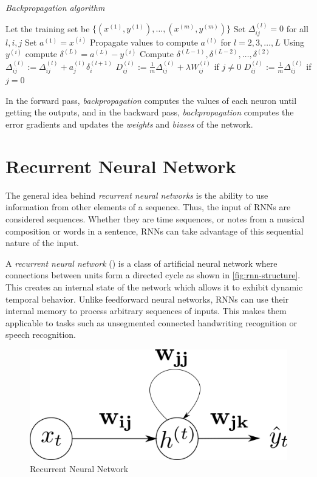 \begin{algorithm}[H]
  \caption{\textit{Backpropagation algorithm}}
  \label{backpropagation-algorithm}
  \begin{algorithmic}[1]
    \State Let the training set be $\{(x^{(1)},y^{(1)}),\dots,
    (x^{(m)},y^{(m)})\}$
    \State Set $\Delta_{ij}^{(l)} = 0$ for all $l,i,j$
    \State Set $a^{(1)} = x^{(i)}$
    \State Propagate values to compute $a^{(l)}$ for $l = 2,
    3, \dots, L$
    \State Using $y^{(i)}$ compute $\delta^{(L)} = a^{(L)} - y^{(i)}$
    \State Compute $\delta^{(L-1)}, \delta^{(L-2)}, \dots,
    \delta^{(2)}$
    \State $\Delta_{ij}^{(l)} := \Delta_{ij}^{(l)} + a_j^{(l)} \delta_i^{(l+1)}$
    \EndFor
    \State $D_{ij}^{(l)} := \frac{1}{m} \Delta_{ij}^{(l)} + \lambda
    W_{ij}^{(l)}$ if $j \neq 0$
    \State $D_{ij}^{(l)} := \frac{1}{m} \Delta_{ij}^{(l)}$ if $j = 0$
  \end{algorithmic}
\end{algorithm}

In the forward pass, \textit{backpropagation} computes the values of
each neuron until getting the outputs, and in the backward pass,
\textit{backpropagation} computes the error gradients and updates the
\textit{weights} and \textit{biases} of the network.

\section{Recurrent Neural Network}
\label{sec:rnn-nets}

The general idea behind \textit{recurrent neural networks} is the
ability to use information from other elements of a sequence. Thus,
the input of RNNs are considered sequences. Whether they are time
sequences, or notes from a musical composition or words in a sentence,
RNNs can take advantage of this sequential nature of the input.

A \textit{recurrent neural network} (\cite{rumelhart1986sequential})
is a class of artificial neural network where connections between
units form a directed cycle as shown in \autoref{fig:rnn-structure}.
This creates an internal state of the network which allows it to
exhibit dynamic temporal behavior. Unlike feedforward neural networks,
RNNs can use their internal memory to process arbitrary sequences of
inputs. This makes them applicable to tasks such as unsegmented
connected handwriting recognition or speech recognition.

\begin{figure}[bth]
  \centering
  \includegraphics[width=.4\linewidth]{gfx/rnn.png}
  \caption{Recurrent Neural Network}
  \label{fig:rnn-structure}
\end{figure}

